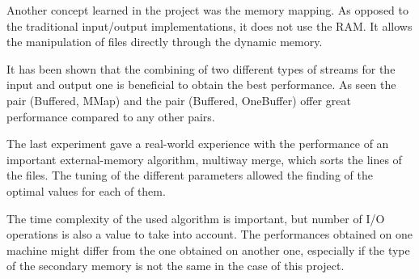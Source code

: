 \documentclass[12pt]{article}
\begin{document}
Another concept learned in the project was the memory mapping. As opposed to the traditional input/output implementations, it does not use the RAM. It allows the manipulation of files directly through the dynamic memory.

It has been shown that the combining of two different types of streams for the input and output one is beneficial to obtain the best performance. As seen the pair (Buffered, MMap) and the pair (Buffered, OneBuffer) offer great performance compared to any other pairs.

The last experiment gave a real-world experience with the performance of an important external-memory algorithm, multiway merge, which sorts the lines of the files. The tuning of the different parameters allowed the finding of the optimal values for each of them.

The time complexity of the used algorithm is important, but number of I/O operations is also a value to take into account. The performances obtained on one machine might differ from the one obtained on another one, especially if the type of the secondary memory is not the same in the case of this project.
\end{document}
